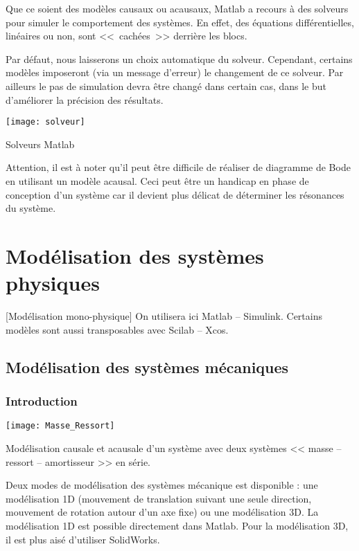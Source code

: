 Que ce soient des modèles causaux ou acausaux, Matlab a recours à des solveurs pour simuler le comportement des systèmes. En effet, des équations différentielles, linéaires ou non, sont <<~cachées~>> derrière les blocs.  

Par défaut, nous laisserons un choix automatique du solveur. Cependant, certains modèles imposeront (via un message d'erreur) le changement de ce solveur. Par ailleurs le pas de simulation devra être changé dans certain cas, dans le but d'améliorer la précision des résultats.

\begin{marginfigure}[-2cm]
\texttt{[image: solveur]}
\caption{Solveurs Matlab}
\end{marginfigure}


\begin{warn}
Attention, il est à noter qu'il peut être difficile de réaliser de diagramme de Bode en utilisant un modèle acausal. Ceci peut être un handicap en phase de conception d'un système car il devient plus délicat de déterminer les résonances du système.
\end{warn}
\section{Modélisation des systèmes physiques}[Modélisation mono-physique]
On utilisera ici Matlab -- Simulink. Certains modèles sont aussi transposables avec Scilab -- Xcos. 

\subsection{Modélisation des systèmes mécaniques}
\subsubsection{Introduction}

\begin{marginfigure}[-1.5cm]
\texttt{[image: Masse\_Ressort]}

\caption{Modélisation causale et acausale d'un système avec deux systèmes << masse -- ressort -- amortisseur >> en série.}
\end{marginfigure}

Deux modes de modélisation des systèmes mécanique est disponible : une modélisation 1D (mouvement de translation suivant une seule direction, mouvement de rotation autour d'un axe fixe) ou une modélisation 3D. 
La modélisation 1D est possible directement dans Matlab. Pour la modélisation 3D, il est plus aisé d'utiliser SolidWorks. 


